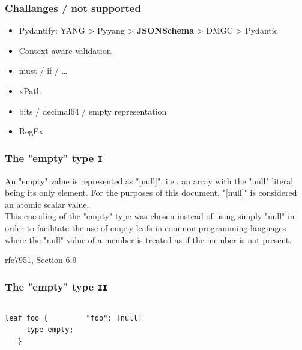 \documentclass[aspectratio=169]{beamer}
\begin{document}
\begin{frame}
  \frametitle{Challanges / not supported}
  \begin{itemize}
    \setlength\itemsep{1em}
    \item Pydantify: YANG > Pyyang > \textbf{JSONSchema} > DMGC > Pydantic
    \item Context-aware validation
    \item must / if / \dots
    \item xPath
    \item bits / decimal64 / empty representation
    \item RegEx
  \end{itemize}
\end{frame}


\begin{frame}
  \frametitle{The "empty" type \texttt{I}}
      \begin{itshape}
   An "empty" value is represented as "[null]", i.e., an array with the
   "null" literal being its only element.  For the purposes of this
   document, "[null]" is considered an atomic scalar value.
\\

   This encoding of the "empty" type was chosen instead of using simply
   "null" in order to facilitate the use of empty leafs in common
   programming languages where the "null" value of a member is treated
   as if the member is not present.
      \end{itshape}
    \begin{flushright}
        \underline{rfc7951}, Section 6.9
    \end{flushright}
\end{frame}

\begin{frame}[fragile]
  \frametitle{The "empty" type \texttt{II}}

  \begin{columns}
        \begin{verbatim}
leaf foo {
     type empty;
   }
\end{verbatim}
        \begin{verbatim}
"foo": [null]
\end{verbatim}
    \end{columns}
\end{frame}
\end{document}
